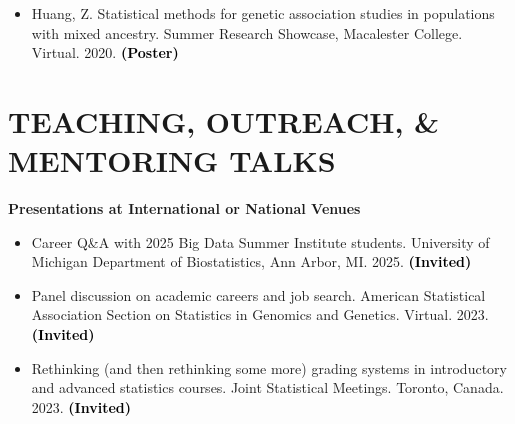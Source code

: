 \documentclass[margin]{res}
\newenvironment{benumerate}[1]{
    \let\oldItem\item
    \def\item{\addtocounter{enumi}{-2}\oldItem}
    
    \begin{enumerate}
    \setcounter{enumi}{#1}
    \addtocounter{enumi}{1}
}{
    \end{enumerate}
}
\newcommand{\annotate}[1]{\textcolor{black}{\textbf{(#1)}}}
\newcommand{\annotateItem}[1]{
	\begin{itemize} \vspace{-0.1cm}
	\item[] 
	\begin{footnotesize}\textcolor{black}{(#1)}\end{footnotesize}
	\end{itemize} \vspace{-0.1cm}
}
\begin{document}
\begin{resume}
\begin{itemize}
\item[1.] Huang, Z. 
Statistical methods for genetic association studies in populations with mixed ancestry. 
Summer Research Showcase, Macalester College. Virtual. 2020. 
\annotate{Poster} \\

\end{itemize}




\section{TEACHING, OUTREACH, \& MENTORING  TALKS}

\textbf{Presentations at International or National Venues}

\begin{itemize}

\item[5.] Career Q\&A with 2025 Big Data Summer Institute students. University of Michigan Department of Biostatistics, Ann Arbor, MI. 2025. \annotate{Invited}


\item[4.] Panel discussion on academic careers and job search. 
American Statistical Association Section on Statistics in Genomics and Genetics. Virtual. 2023. 
\annotate{Invited}

\item[3.] Rethinking (and then rethinking some more) grading systems in introductory and advanced statistics courses. 
Joint Statistical Meetings. Toronto, Canada. 2023. 
\annotate{Invited}


\end{itemize}
\end{resume}
\end{document}

